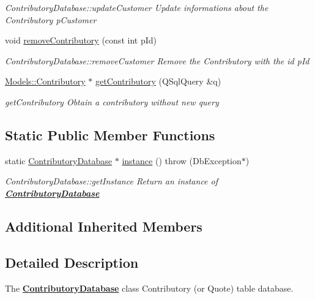 \begin{DoxyCompactItemize}
\begin{DoxyCompactList}\small\item\em Contributory\+Database\+::update\+Customer Update informations about the Contributory {\itshape p\+Customer} \end{DoxyCompactList}\item 
void \hyperlink{classDatabase_1_1ContributoryDatabase_aa362a76075ce095410411d7ac26bad5c}{remove\+Contributory} (const int p\+Id)
\begin{DoxyCompactList}\small\item\em Contributory\+Database\+::remove\+Customer Remove the Contributory with the id {\itshape p\+Id} \end{DoxyCompactList}\item 
\hyperlink{classModels_1_1Contributory}{Models\+::\+Contributory} $\ast$ \hyperlink{classDatabase_1_1ContributoryDatabase_af09f192038c786e0f4a2501214667cda}{get\+Contributory} (Q\+Sql\+Query \&q)
\begin{DoxyCompactList}\small\item\em get\+Contributory Obtain a contributory without new query \end{DoxyCompactList}\end{DoxyCompactItemize}
\subsection*{Static Public Member Functions}
\begin{DoxyCompactItemize}
\item 
static \hyperlink{classDatabase_1_1ContributoryDatabase}{Contributory\+Database} $\ast$ \hyperlink{classDatabase_1_1ContributoryDatabase_af454afba7ef6f6e267085db89e5f8da4}{instance} ()  throw (\+Db\+Exception$\ast$)
\begin{DoxyCompactList}\small\item\em Contributory\+Database\+::get\+Instance Return an instance of {\bfseries \hyperlink{classDatabase_1_1ContributoryDatabase}{Contributory\+Database}} \end{DoxyCompactList}\end{DoxyCompactItemize}
\subsection*{Additional Inherited Members}


\subsection{Detailed Description}
The {\bfseries \hyperlink{classDatabase_1_1ContributoryDatabase}{Contributory\+Database}} class Contributory (or Quote) table database. 

